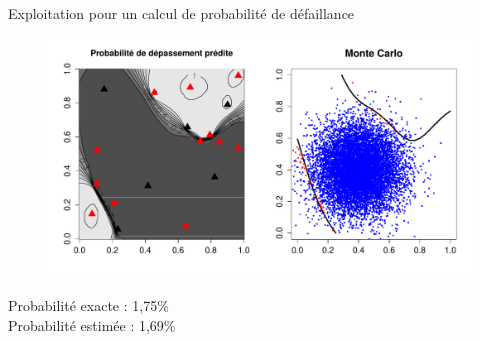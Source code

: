 \begin{frame}{Exploitation pour un calcul de probabilité de défaillance}

\begin{figure} 
\centering
\includegraphics[width=\textwidth]{figT/Pf.pdf} 
\end{figure}

Probabilité exacte : 1,75\% \\
Probabilité estimée : 1,69\%
\end{frame}
